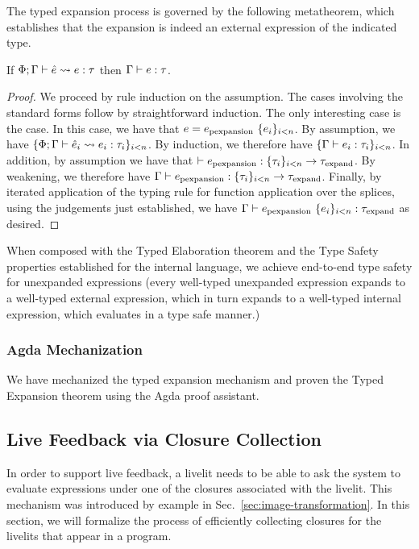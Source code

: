 The typed expansion process is governed by the following metatheorem, which establishes that the expansion
is indeed an external expression of the indicated type.

\begin{theorem}
    If $\Phi; \Gamma \vdash \hat e \leadsto e : \tau$ then $\Gamma \vdash e : \tau$.
\end{theorem}
\begin{proof}
    We proceed by rule induction on the assumption.
    The cases involving the standard forms follow by straightforward induction.
    The only interesting case is the  case.
    In this case, we have that $e = e_\text{pexpansion}~\{e_i\}_{i < n}$.
    By assumption, we have $\{ \Phi; \Gamma \vdash \hat e_i \leadsto e_i : \tau_i \}_{i < n}$.
    By induction, we therefore have $\{ \Gamma \vdash e_i : \tau_i \}_{i < n}$.
    In addition, by assumption we have that $\vdash e_\text{pexpansion} : \{\tau_i\}_{i < n} \rightarrow \tau_\text{expand}$.
    By weakening, we therefore have $\Gamma \vdash e_\text{pexpansion} : \{\tau_i\}_{i < n} \rightarrow \tau_\text{expand}$.
    Finally, by iterated application of the typing rule for function application over the splices,
    using the judgements just established,
    we have $\Gamma \vdash e_\text{pexpansion}~\{e_i\}_{i < n} : \tau_\text{expand}$ as desired.
\end{proof}

When composed with the Typed Elaboration theorem and the Type Safety properties established for the internal
language, we achieve end-to-end type safety for unexpanded expressions (every well-typed unexpanded
expression expands to a well-typed external expression, which in turn expands to a well-typed internal
expression, which evaluates in a type safe manner.)

\subsubsection{Agda Mechanization}
We have mechanized the typed expansion mechanism and proven the Typed Expansion theorem
using the Agda proof assistant.

\subsection{Live Feedback via Closure Collection}
In order to support live feedback, a livelit needs to be able to ask the system
to evaluate expressions under one of the closures associated with the livelit.
This mechanism was introduced by example in Sec.~\ref{sec:image-transformation}.
In this section, we will formalize the process of efficiently collecting closures
for the livelits that appear in a program.

